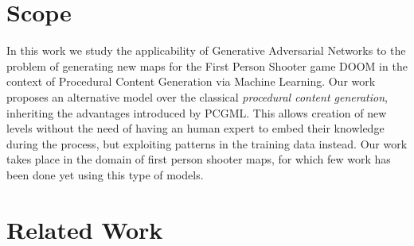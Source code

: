 \section{Scope}
In this work we study the applicability of Generative Adversarial Networks to the problem of generating new maps for the First Person Shooter game DOOM in the context of Procedural Content Generation via Machine Learning. Our work proposes an alternative model over the classical \textit{procedural content generation}, inheriting the advantages introduced by PCGML. This allows creation of new levels without the need of having an human expert to embed their knowledge during the process, but exploiting patterns in the training data instead. Our work takes place in the domain of first person shooter maps, for which few work has been done yet using this type of models.

\section{Related Work}
